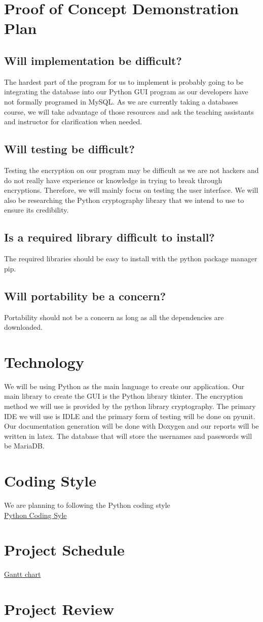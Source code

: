 \documentclass{article}
\begin{document}
\section{Proof of Concept Demonstration Plan}
\subsection{Will implementation be difficult?}
The hardest part of the program for us to implement is probably going to be integrating the database into our Python GUI program as our developers have not formally programed in MySQL. As we are currently taking a databases course, we will take advantage of those resources and ask the teaching assistants and instructor for clarification when needed.
\subsection{Will testing be difficult?}
Testing the encryption on our program may be difficult as we are not hackers and do not really have experience or knowledge in trying to break through encryptions. Therefore, we will mainly focus on testing the user interface. We will also be researching the Python cryptography library that we intend to use to ensure its credibility.
\subsection{Is a required library difficult to install?}
The required libraries should be easy to install with the python package manager pip.
\subsection{Will portability be a concern?}
Portability should not be a concern as long as all the dependencies are downloaded.

\section{Technology}
We will be using Python as the main language to create our application. Our main library to create the GUI is the Python library tkinter. The encryption method we will use is provided by the python library cryptography. The primary IDE we will use is IDLE and the primary form of testing will be done on pyunit. Our documentation generation will be done with Doxygen and our reports will be written in latex. The database that will store the usernames and passwords will be MariaDB.

\section{Coding Style}
We are planning to following the Python coding style\\
\href{https://google.github.io/styleguide/pyguide.html}{Python Coding Syle}

\section{Project Schedule}
\href{run:/ProjectSchedule/GanttChart.gen}{Gantt chart}

\section{Project Review}
\end{document}
